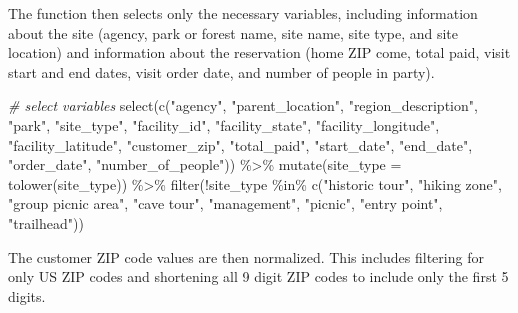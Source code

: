 \documentclass[
]{book}
\newenvironment{Shaded}{\begin{snugshade}}{\end{snugshade}}
\newcommand{\AttributeTok}[1]{\textcolor[rgb]{0.77,0.63,0.00}{#1}}
\newcommand{\CommentTok}[1]{\textcolor[rgb]{0.56,0.35,0.01}{\textit{#1}}}
\newcommand{\FunctionTok}[1]{\textcolor[rgb]{0.00,0.00,0.00}{#1}}
\newcommand{\NormalTok}[1]{#1}
\newcommand{\SpecialCharTok}[1]{\textcolor[rgb]{0.00,0.00,0.00}{#1}}
\newcommand{\StringTok}[1]{\textcolor[rgb]{0.31,0.60,0.02}{#1}}
\begin{document}
The function then selects only the necessary variables, including information about the site (agency, park or forest name, site name, site type, and site location) and information about the reservation (home ZIP come, total paid, visit start and end dates, visit order date, and number of people in party).

\begin{Shaded}
\begin{Highlighting}[]
\CommentTok{\# select variables}
\FunctionTok{select}\NormalTok{(}\FunctionTok{c}\NormalTok{(}\StringTok{"agency"}\NormalTok{, }\StringTok{"parent\_location"}\NormalTok{, }\StringTok{"region\_description"}\NormalTok{, }\StringTok{"park"}\NormalTok{,}
         \StringTok{"site\_type"}\NormalTok{, }\StringTok{"facility\_id"}\NormalTok{, }\StringTok{"facility\_state"}\NormalTok{, }\StringTok{"facility\_longitude"}\NormalTok{,}
         \StringTok{"facility\_latitude"}\NormalTok{, }\StringTok{"customer\_zip"}\NormalTok{, }\StringTok{"total\_paid"}\NormalTok{, }\StringTok{"start\_date"}\NormalTok{,}
         \StringTok{"end\_date"}\NormalTok{, }\StringTok{"order\_date"}\NormalTok{, }\StringTok{"number\_of\_people"}\NormalTok{)) }\SpecialCharTok{\%\textgreater{}\%}
  \FunctionTok{mutate}\NormalTok{(}\AttributeTok{site\_type =} \FunctionTok{tolower}\NormalTok{(site\_type)) }\SpecialCharTok{\%\textgreater{}\%}
  \FunctionTok{filter}\NormalTok{(}\SpecialCharTok{!}\NormalTok{site\_type }\SpecialCharTok{\%in\%} \FunctionTok{c}\NormalTok{(}\StringTok{"historic tour"}\NormalTok{, }\StringTok{"hiking zone"}\NormalTok{, }\StringTok{"group picnic area"}\NormalTok{, }\StringTok{"cave tour"}\NormalTok{,}
                           \StringTok{"management"}\NormalTok{, }\StringTok{"picnic"}\NormalTok{, }\StringTok{"entry point"}\NormalTok{, }\StringTok{"trailhead"}\NormalTok{))}
\end{Highlighting}
\end{Shaded}

The customer ZIP code values are then normalized. This includes filtering for only US ZIP codes and shortening all 9 digit ZIP codes to include only the first 5 digits.
\end{document}
